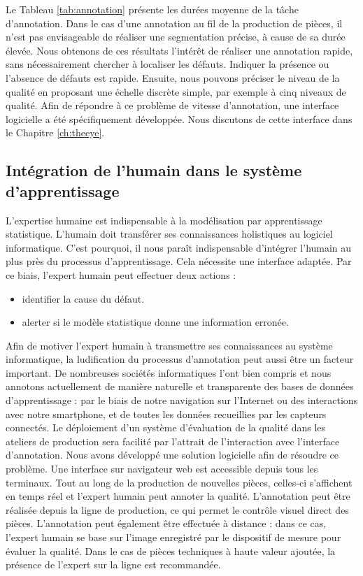 Le Tableau \ref{tab:annotation} présente les durées moyenne de la tâche d'annotation.
Dans le cas d'une annotation au fil de la production de pièces, il n'est pas envisageable de réaliser une segmentation précise, à cause de sa durée élevée.
Nous obtenons de ces résultats l'intérêt de réaliser une annotation rapide, sans nécessairement chercher à localiser les défauts.
Indiquer la présence ou l'absence de défauts est rapide.
Ensuite, nous pouvons préciser le niveau de la qualité en proposant une échelle discrète simple, par exemple à cinq niveaux de qualité.
Afin de répondre à ce problème de vitesse d'annotation, une interface logicielle a été spécifiquement développée.
Nous discutons de cette interface dans le Chapitre \ref{ch:theeye}.

\subsection{Intégration de l'humain dans le système d'apprentissage}
L'expertise humaine est indispensable à la modélisation par apprentissage statistique.
L'humain doit transférer ses connaissances holistiques au logiciel informatique.
C'est pourquoi, il nous paraît indispensable d'intégrer l'humain au plus près du processus d'apprentissage.
Cela nécessite une interface adaptée.
Par ce biais, l'expert humain peut effectuer deux actions :
\begin{itemize}
    \item identifier la cause du défaut.
    \item alerter si le modèle statistique donne une information erronée.
\end{itemize}
Afin de motiver l'expert humain à transmettre ses connaissances au système informatique, la ludification du processus d'annotation peut aussi être un facteur important.
De nombreuses sociétés informatiques l'ont bien compris et nous annotons actuellement de manière naturelle et transparente des bases de données d'apprentissage : par le biais de notre navigation sur l'Internet ou des interactions avec notre smartphone, et de toutes les données recueillies par les capteurs connectés.
Le déploiement d'un système d'évaluation de la qualité dans les ateliers de production sera facilité par l'attrait de l'interaction avec l'interface d'annotation.
Nous avons développé une solution logicielle afin de résoudre ce problème. Une interface sur navigateur web est accessible depuis tous les terminaux.
Tout au long de la production de nouvelles pièces, celles-ci s'affichent en temps réel et l'expert humain peut annoter la qualité.
L'annotation peut être réalisée depuis la ligne de production, ce qui permet le contrôle visuel direct des pièces.
L'annotation peut également être effectuée à distance : dans ce cas, l'expert humain se base sur l'image enregistré par le dispositif de mesure pour évaluer la qualité.
Dans le cas de pièces techniques à haute valeur ajoutée, la présence de l'expert sur la ligne est recommandée.

